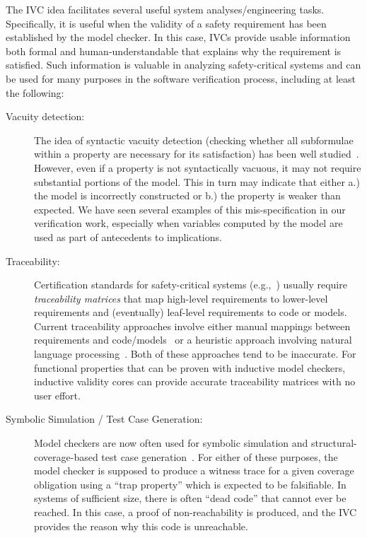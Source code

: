 The IVC idea facilitates several useful system analyses/engineering tasks. Specifically, it is useful when the validity of a safety requirement has been established by the model checker. In this case, IVCs provide usable information both formal and human-understandable that explains why the requirement is satisfied. Such information is valuable in analyzing safety-critical systems and can be used for many purposes in the software verification process, including at least the following:
\begin{description}
    \item[Vacuity detection:] The idea of syntactic vacuity detection (checking whether all subformulae within a property are necessary for its satisfaction) has been well studied~\cite{Kupferman03:Vacuity}.   However, even if a property is not syntactically vacuous, it may not require substantial portions of the model.  This in turn may indicate that either a.) the model is incorrectly constructed or b.) the property is weaker than expected.  We have seen several examples of this mis-specification in our verification work, especially when variables computed by the model are used as part of antecedents to implications.
    \item[Traceability:] Certification standards for safety-critical systems (e.g.,~\cite{DO178C, MOD:00-55}) usually require {\em traceability matrices} that map high-level requirements to lower-level requirements and (eventually) leaf-level requirements to code or models.  Current traceability approaches involve either manual mappings between requirements and code/models~\cite{SimulinkTraceability} or a heuristic approach involving natural language processing~\cite{Keenan12:Tracelab}.  Both of these approaches tend to be inaccurate.  For functional properties that can be proven with inductive model checkers, inductive validity cores can provide accurate traceability matrices with no user effort.
    \item[Symbolic Simulation / Test Case Generation:]  Model checkers are now often used for symbolic simulation and structural-coverage-based test case generation~\cite{SimulinkDesignVerifier,Whalen13:OMCDC}.  For either of these purposes, the model checker is supposed to produce a witness trace for a given coverage obligation using a ``trap property'' which is expected to be falsifiable.  In systems of sufficient size, there is often ``dead code'' that cannot ever be reached.  In this case, a proof of non-reachability is produced, and the IVC provides the reason why this code is unreachable.
\end{description}

